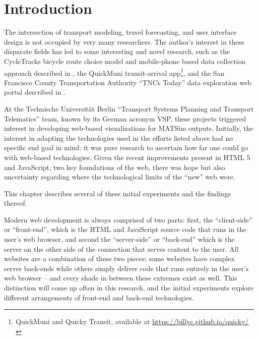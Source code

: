 \hypertarget{server-experiments-introduction}{%
\section{Introduction}\label{server-experiments-intro}}


The intersection of transport modeling, travel forecasting, and user interface design is not occupied by very many researchers. The author's interest in these disparate fields has led to some interesting and novel research, such as the CycleTracks bicycle route choice model and mobile-phone based data collection approach described in \cite{HoodSallCharlton2011BicycleRouteChoiceSanFrancisco}, the QuickMuni transit-arrival app\footnote{QuickMuni and Quicky Transit, available at \url{https://billyc.github.io/quicky/}}, and the San Francisco County Transportation Authority ``TNCs Today'' data exploration web portal described in \cite{erhardt2019transportation}.

At the Technische Universität Berlin ``Transport Systems Planning and Transport Telematics'' team, known by its German acronym \gls{VSP}, these projects triggered interest in developing web-based visualizations for \gls{MATSim} outputs. Initially, the interest in adapting the technologies used in the efforts listed above had no specific end goal in mind: it was pure research to ascertain how far one could go with web-based technologies. Given the recent improvements present in \gls{HTML 5} and \gls{JavaScript}, two key foundations of the web, there was hope but also uncertainty regarding where the technological limits of the ``new'' web were.

This chapter describes several of these initial experiments and the findings thereof.

Modern web development is always comprised of two parts: first, the ``client-side'' or ``front-end'', which is the HTML and JavaScript source code that runs in the user's web browser, and second the ``server-side'' or ``back-end'' which is the server on the other side of the connection that serves content to the user. All websites are a combination of these two pieces; some websites have complex server back-ends while others simply deliver code that runs entirely in the user's web browser -- and every shade in between these extremes exist as well. This distinction will come up often in this research, and the initial experiments explore different arrangements of front-end and back-end technologies.

